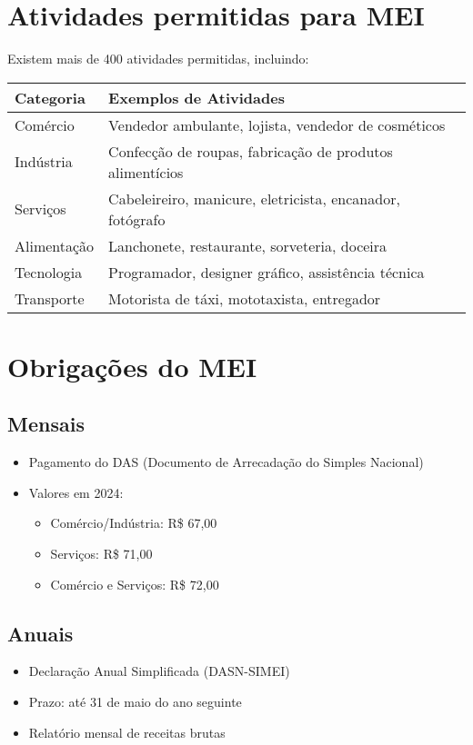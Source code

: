 \documentclass[12pt,a4paper]{article}
\begin{document}
\section{Atividades permitidas para MEI}

Existem mais de 400 atividades permitidas, incluindo:

\begin{longtable}{|p{6cm}|p{8cm}|}
\hline
\textbf{Categoria} & \textbf{Exemplos de Atividades} \\
\hline
Comércio & Vendedor ambulante, lojista, vendedor de cosméticos \\
\hline
Indústria & Confecção de roupas, fabricação de produtos alimentícios \\
\hline
Serviços & Cabeleireiro, manicure, eletricista, encanador, fotógrafo \\
\hline
Alimentação & Lanchonete, restaurante, sorveteria, doceira \\
\hline
Tecnologia & Programador, designer gráfico, assistência técnica \\
\hline
Transporte & Motorista de táxi, mototaxista, entregador \\
\hline
\end{longtable}

\section{Obrigações do MEI}

\subsection{Mensais}
\begin{itemize}
    \item Pagamento do DAS (Documento de Arrecadação do Simples Nacional)
    \item Valores em 2024:
    \begin{itemize}
        \item Comércio/Indústria: R\$ 67,00
        \item Serviços: R\$ 71,00
        \item Comércio e Serviços: R\$ 72,00
    \end{itemize}
\end{itemize}

\subsection{Anuais}
\begin{itemize}
    \item Declaração Anual Simplificada (DASN-SIMEI)
    \item Prazo: até 31 de maio do ano seguinte
    \item Relatório mensal de receitas brutas
\end{itemize}
\end{document}
